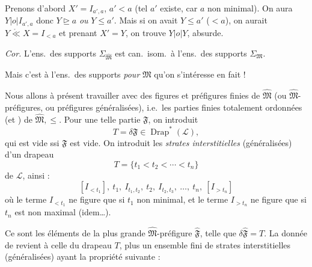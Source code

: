 \documentclass[11pt,a4paper]{article}
\begin{document}
Prenons d'abord $X' = I_{a',a}$,  $a' < a$ (tel $a'$ existe, car $a$ non minimal). On aura $Y \mathrel{|o|} I_{a',a}$ donc $Y \trianglerighteq a$ \emph{ou} $Y \leq a'$. Mais si on avait $Y \leq a'$ ($< a$), on aurait $Y \mathrel{\mathring{\ll}} X = I_{<a}$ et prenant $X' = Y$, on trouve $Y \mathrel{|o|} Y$, absurde.


 

\emph{Cor.} L'ens.\ des supports $\Sigma_{\widehat{\mathfrak{M}}}$ est can.\ isom.\ à l'ens.\ des supports $\Sigma_{\mathfrak{M}}$.


Mais c'est à l'ens.\ des supports \emph{pour} $\mathfrak{M}$ qu'on s'intéresse en fait !

Nous allons à présent travailler avec des figures et préfigures finies de $\widehat{\mathfrak{M}}$ (ou $\widehat{\mathfrak{M}}$-préfigures, ou préfigures généralisées), i.e.\ les parties finies totalement ordonnées (et \uncertain{\ill{}}) de $\widehat{\mathfrak{M}}, \leq$. Pour une telle partie $\mathfrak{F}$, on introduit
\[
  T = \delta \mathfrak{F} \in \operatorname{Drap}^{*}(\mathcal{L}) ,
\]
\add{\ill{}} qui est vide ssi $\mathfrak{F}$ est vide.  On introduit les \emph{strates interstitielles} (généralisées) d'un drapeau
\[
  T = \{ t_1 < t_2 < \cdots < t_n \}
\]
de $\mathcal{L}$, ainsi : \struck{\ill{}}
\[
  [I_{<t_1}],\ t_1,\ I_{t_1,t_2},\ t_2,\ I_{t_2,t_3},\ \ldots,\ t_n,\ [I_{>t_n}]
\]
où le terme $I_{<t_1}$ ne figure que si  $t_1$ non minimal, et le terme $I_{>t_n}$ ne figure que si $t_n$ est non maximal (idem\ldots).

Ce sont les éléments de la plus grande $\widehat{\mathfrak{M}}$-préfigure  $\widehat{\mathfrak{F}}$, telle que $\delta\widehat{\mathfrak{F}} = T$.  La donnée de  revient à celle du drapeau $T$, plus un ensemble fini  de strates interstitielles (généralisées) ayant la propriété suivante :
\end{document}

